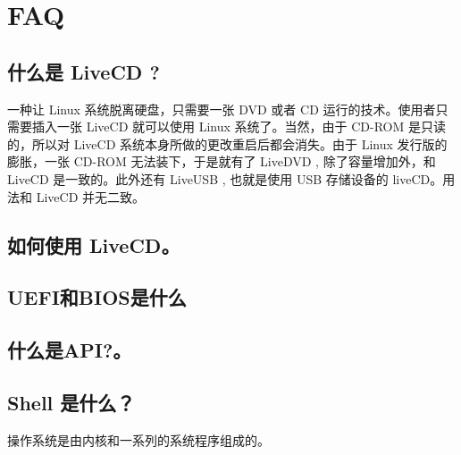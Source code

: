 \chapter{FAQ}\label{FAQ}

\section{什么是 LiveCD ?}\label{FAQ:LiveCD}
一种让 Linux 系统脱离硬盘，只需要一张 DVD 或者 CD 运行的技术。使用者只需要插入一张 LiveCD 就可以使用 Linux  系统了。当然，由于 CD-ROM 是只读的，所以对 LiveCD 系统本身所做的更改重启后都会消失。由于 Linux 发行版的膨胀，一张 CD-ROM 无法装下，于是就有了 LiveDVD , 除了容量增加外，和LiveCD 是一致的。此外还有 LiveUSB , 也就是使用 USB 存储设备的 liveCD。用法和 LiveCD 并无二致。

\section{如何使用 LiveCD。}\label{FAQ:UseLiveCD}

\section{UEFI和BIOS是什么}


\section{什么是API?。}\label{FAQ:API}

\section{Shell 是什么？}
操作系统是由内核和一系列的系统程序组成的。
